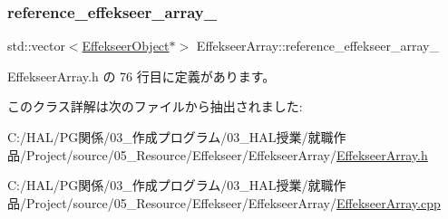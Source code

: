\subsubsection{\texorpdfstring{reference\+\_\+effekseer\+\_\+array\+\_\+}{reference\_effekseer\_array\_}}
{\footnotesize\ttfamily std\+::vector$<$\mbox{\hyperlink{class_effekseer_object}{Effekseer\+Object}}$\ast$$>$ Effekseer\+Array\+::reference\+\_\+effekseer\+\_\+array\+\_\+\hspace{0.3cm}{\ttfamily [private]}}



 Effekseer\+Array.\+h の 76 行目に定義があります。



このクラス詳解は次のファイルから抽出されました\+:\begin{DoxyCompactItemize}
\item 
C\+:/\+H\+A\+L/\+P\+G関係/03\+\_\+作成プログラム/03\+\_\+\+H\+A\+L授業/就職作品/\+Project/source/05\+\_\+\+Resource/\+Effekseer/\+Effekseer\+Array/\mbox{\hyperlink{_effekseer_array_8h}{Effekseer\+Array.\+h}}\item 
C\+:/\+H\+A\+L/\+P\+G関係/03\+\_\+作成プログラム/03\+\_\+\+H\+A\+L授業/就職作品/\+Project/source/05\+\_\+\+Resource/\+Effekseer/\+Effekseer\+Array/\mbox{\hyperlink{_effekseer_array_8cpp}{Effekseer\+Array.\+cpp}}\end{DoxyCompactItemize}
